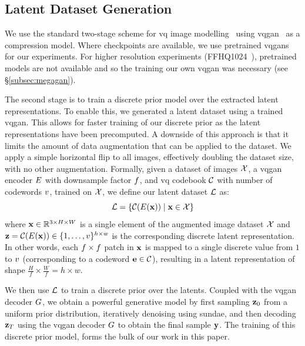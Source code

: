 \subsection{Latent Dataset Generation}
\label{subsec:datasetGen}

We use the standard two-stage scheme for \gls{vq} image
modelling~\cite{oord2018neural,razavi2019generating,esser2021taming,bondtaylor2021unleashing}
using \gls{vqgan}~\cite{esser2021taming} as a compression model. Where
checkpoints are available, we use pretrained \glspl{vqgan} for our experiments.
For higher resolution experiments (FFHQ1024~\cite{karras2019stylebased}),
pretrained models are not available and so the training our own \gls{vqgan} was
necessary (see \S\ref{subsec:megagan}). 

The second stage is to train a discrete prior model over the extracted latent
representations. To enable this, we generated a latent dataset using a trained
\gls{vqgan}. This allows for faster training of our discrete prior as the
latent representations have been precomputed. A downside of this
approach is that it limits the amount of data augmentation that can be applied
to the dataset. We apply a simple horizontal flip to all images, effectively
doubling the dataset size, with no other augmentation. Formally, given a dataset
of images $\mathcal{X}$, a \gls{vqgan} encoder $E$ with downsample
factor $f$, and \gls{vq} codebook $\mathcal{C}$ with number of
codewords $v$, trained on $\mathcal{X}$, we define our latent
dataset $\mathcal{L}$ as:
\begin{equation}
    \mathcal{L} = \{\mathcal{C}(E(\mathbf{x})) \mid \mathbf{x} \in \mathcal{X} \}
\end{equation}
where $\mathbf{x} \in \mathbb{R}^{3 \times H \times W}$ is a single element of the
augmented image
dataset $\mathcal{X}$ and $\mathbf{z} = \mathcal{C}(E(\mathbf{x})) \in \{1, \dots,
v\}^{h \times w}$ is the corresponding discrete latent
representation. In other words, each $f \times f$
patch in $\mathbf{x}$ is mapped to a single discrete value from $1$ to
$v$ (corresponding to a codeword $\mathbf{e} \in
\mathcal{C}$),
resulting in a latent representation of shape $\frac{H}{f} \times \frac{W}{f} =
h \times w$.

We then use $\mathcal{L}$ to train a discrete prior over the latents. Coupled
with the \gls{vqgan} decoder $G$, we obtain a powerful generative
model by first sampling $\mathbf{z}_0$ from a uniform prior distribution,
iteratively denoising using \gls{sundae}, and then decoding
$\mathbf{z}_T$ using the \gls{vqgan} decoder $G$ to obtain
the final sample $\mathbf{y}$. The training of this discrete prior model, forms the
bulk of our work in this paper.

